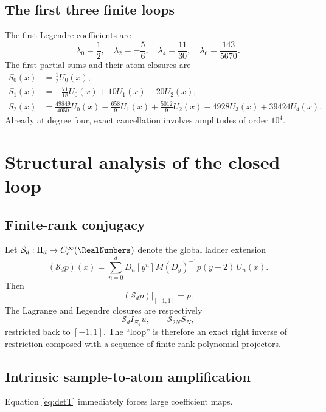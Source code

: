 \documentclass[11pt,oneside]{article}
\theoremstyle{definition}
\theoremstyle{remark}
\newcommand{\cS}{\mathcal S}
\begin{document}
\subsection{The first three finite loops}
The first Legendre coefficients are
\begin{equation}
 \lambda_0=\frac12,
 \quad \lambda_2=-\frac56,
 \quad \lambda_4=\frac{11}{30},
 \quad \lambda_6=\frac{143}{5670}.
 \label{eq:first-lambdas}
\end{equation}
The first partial sums and their atom closures are
\begin{align}
 S_0(x)&=\frac12U_0(x),
 \label{eq:S0-loop}\\
 S_1(x)&=-\frac{71}{18}U_0(x)+10U_1(x)-20U_2(x),
 \label{eq:S1-loop}\\
 S_2(x)&=\frac{49849}{4050}U_0(x)-\frac{658}{9}U_1(x)
 +\frac{5012}{9}U_2(x)-4928U_3(x)+39424U_4(x).
 \label{eq:S2-loop}
\end{align}
Already at degree four, exact cancellation involves amplitudes of order
$10^4$.

\section{Structural analysis of the closed loop}

\subsection{Finite-rank conjugacy}
Let $\cS_d:\Pi_d\to C_c^\infty(\RealNumbers)$ denote the global ladder extension
\begin{equation}
 (\cS_dp)(x)=\sum_{n=0}^{d}
 D_n[y^n]M(D_y)^{-1}p(y-2)\,U_n(x).
 \label{eq:Sd-extension}
\end{equation}
Then
\begin{equation}
 (\cS_dp)|_{[-1,1]}=p.
 \label{eq:right-inverse}
\end{equation}
The Lagrange and Legendre closures are respectively
\begin{equation}
 \cS_dI_{\Xi_d}u,
 \qquad
 \cS_{2N}S_N,
 \label{eq:two-closures-operator}
\end{equation}
restricted back to $[-1,1]$.  The ``loop'' is therefore an exact right
inverse of restriction composed with a sequence of finite-rank polynomial
projectors.

\subsection{Intrinsic sample-to-atom amplification}
Equation \eqref{eq:detT} immediately forces large coefficient maps.
\end{document}
